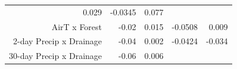\begin{longtable}[]{@{}rrrrr@{}}
\begin{minipage}[t]{0.07\columnwidth}
0.029\strut
\end{minipage} & \begin{minipage}[t]{0.10\columnwidth}\raggedleft\strut
-0.0345\strut
\end{minipage} & \begin{minipage}[t]{0.10\columnwidth}\raggedleft\strut
0.077\strut
\end{minipage}\tabularnewline
\begin{minipage}[t]{0.37\columnwidth}\raggedleft\strut
AirT x Forest\strut
\end{minipage} & \begin{minipage}[t]{0.08\columnwidth}\raggedleft\strut
-0.02\strut
\end{minipage} & \begin{minipage}[t]{0.07\columnwidth}\raggedleft\strut
0.015\strut
\end{minipage} & \begin{minipage}[t]{0.10\columnwidth}\raggedleft\strut
-0.0508\strut
\end{minipage} & \begin{minipage}[t]{0.10\columnwidth}\raggedleft\strut
0.009\strut
\end{minipage}\tabularnewline
\begin{minipage}[t]{0.37\columnwidth}\raggedleft\strut
2-day Precip x Drainage\strut
\end{minipage} & \begin{minipage}[t]{0.08\columnwidth}\raggedleft\strut
-0.04\strut
\end{minipage} & \begin{minipage}[t]{0.07\columnwidth}\raggedleft\strut
0.002\strut
\end{minipage} & \begin{minipage}[t]{0.10\columnwidth}\raggedleft\strut
-0.0424\strut
\end{minipage} & \begin{minipage}[t]{0.10\columnwidth}\raggedleft\strut
-0.034\strut
\end{minipage}\tabularnewline
\begin{minipage}[t]{0.37\columnwidth}\raggedleft\strut
30-day Precip x Drainage\strut
\end{minipage} & \begin{minipage}[t]{0.08\columnwidth}\raggedleft\strut
-0.06\strut
\end{minipage} & \begin{minipage}[t]{0.07\columnwidth}\raggedleft\strut
0.006\strut
\end{minipage} & \begin{minipage}[t]{0.10\columnwidth}\raggedleft\strut

\end{minipage}
\end{longtable}
